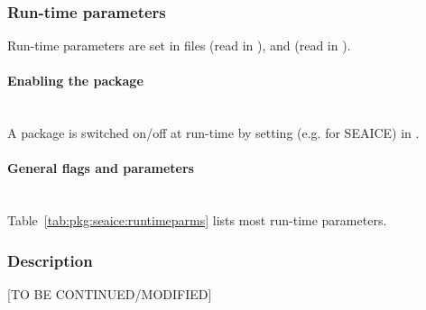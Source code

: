 
\subsubsection{Run-time parameters
\label{sec:pkg:seaice:runtime}}

Run-time parameters are set in files 
 (read in ),
and  (read in ).

\paragraph{Enabling the package}
~ \\
%
A package is switched on/off at run-time by setting
(e.g. for SEAICE)  in .

\paragraph{General flags and parameters}
~ \\
%
Table~\ref{tab:pkg:seaice:runtimeparms} lists most run-time parameters.




\subsubsection{Description
\label{sec:pkg:seaice:descr}}

[TO BE CONTINUED/MODIFIED]


